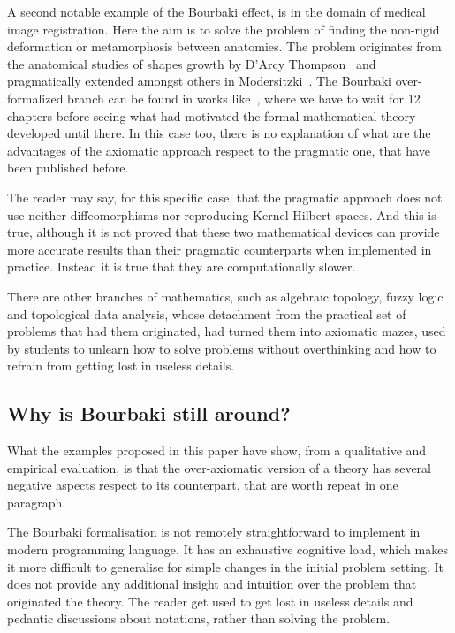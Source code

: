 \documentclass[]{scrartcl}
\theoremstyle{definition}
\begin{document}
A second notable example of the Bourbaki effect, is in the domain of medical image registration. Here the aim is to solve the problem of finding the non-rigid deformation or metamorphosis between anatomies. The problem originates from the anatomical studies of shapes growth by D'Arcy Thompson~\cite{d1942growth} and pragmatically extended amongst others in Modersitzki~\cite{modersitzki2004numerical}. The Bourbaki over-formalized branch can be found in works like~\cite{younes2010shapes}, where we have to wait for 12 chapters before seeing what had motivated the formal mathematical theory developed until there. 
In this case too, there is no explanation of what are the advantages of the axiomatic approach respect to the pragmatic one, that have been published before.

The reader may say, for this specific case, that the pragmatic approach \cite{modersitzki2004numerical} does not use neither diffeomorphisms nor reproducing Kernel Hilbert spaces. And this is true, although it is not proved that these two mathematical devices can provide more accurate results than their pragmatic counterparts when implemented in practice. Instead it is true that they are computationally slower.

There are other branches of mathematics, such as algebraic topology, fuzzy logic and topological data analysis, whose detachment from the practical set of problems that had them originated, had turned them into axiomatic mazes, used by students to unlearn how to solve problems without overthinking and how to refrain from getting lost in useless details.

\subsection*{Why is Bourbaki still around?}

What the examples proposed in this paper have show, from a qualitative and empirical evaluation, is that the over-axiomatic version of a theory has several negative aspects respect to its counterpart, that are worth repeat in one paragraph.

The Bourbaki formalisation is not remotely straightforward to implement in modern programming language. It has an exhaustive cognitive load, which makes it more difficult to generalise for simple changes in the initial problem setting. It does not provide any additional insight and intuition over the problem that originated the theory. The reader get used to get lost in useless details and pedantic discussions about notations, rather than solving the problem.
\end{document}

